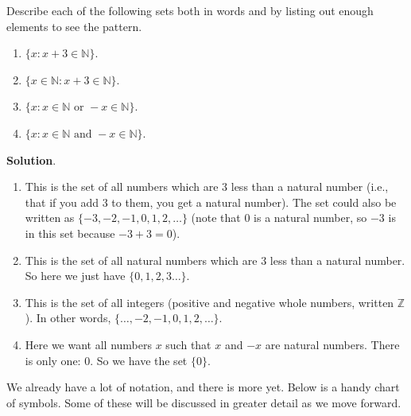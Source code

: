 \documentclass[11pt,]{book}
\theoremstyle{ptxplainnotitle}
\theoremstyle{ptxplaintitle}
\theoremstyle{ptxdefinitionnotitle}
\theoremstyle{ptxdefinitiontitle}
\theoremstyle{ptxdefinitionnotitle}
\theoremstyle{ptxdefinitiontitle}
\theoremstyle{ptxdefinitionnotitle}
\theoremstyle{ptxdefinitiontitle}
\theoremstyle{ptxdefinitiontitlenonumber}
\theoremstyle{ptxdefinitiontitlenonumber}
\numberwithin{equation}{chapter}
\newcommand{\N}{\mathbb N}
\newcommand{\Z}{\mathbb Z}
\newcommand{\st}{:}
\begin{document}
\begin{example}\label{example-28}
\hypertarget{p-717}{}%
Describe each of the following sets both in words and by listing out enough elements to see the pattern.%
\par
\hypertarget{p-718}{}%
\leavevmode%
\begin{enumerate}
\item\hypertarget{li-260}{}\(\{x \st x + 3 \in \N\}\).%
\item\hypertarget{li-261}{}\(\{x \in \N \st x + 3 \in \N\}\).%
\item\hypertarget{li-262}{}\(\{x \st x \in \N \text{ or } -x \in \N\}\).%
\item\hypertarget{li-263}{}\(\{x \st x \in \N \text{ and } -x \in \N\}\).%
\end{enumerate}
%
\par\smallskip%
\noindent\textbf{Solution}.\hypertarget{solution-100}{}\quad%
\hypertarget{p-719}{}%
\leavevmode%
\begin{enumerate}
\item\hypertarget{li-264}{}\hypertarget{p-720}{}%
This is the set of all numbers which are 3 less than a natural number (i.e., that if you add 3 to them, you get a natural number). The set could also be written as \(\{-3, -2, -1, 0, 1, 2, \ldots\}\) (note that 0 is a natural number, so \(-3\) is in this set because \(-3 + 3 = 0\)).%
\item\hypertarget{li-265}{}\hypertarget{p-721}{}%
This is the set of all natural numbers which are 3 less than a natural number. So here we just have \(\{0, 1, 2,3 \ldots\}\).%
\item\hypertarget{li-266}{}\hypertarget{p-722}{}%
This is the set of all integers  (positive and negative whole numbers, written \(\Z\)). In other words, \(\{\ldots, -2, -1, 0, 1, 2, \ldots\}\).%
\item\hypertarget{li-267}{}\hypertarget{p-723}{}%
Here we want all numbers \(x\) such that \(x\) and \(-x\) are natural numbers. There is only one: 0. So we have the set \(\{0\}\).%
\end{enumerate}
%
\end{example}
\hypertarget{p-724}{}%
We already have a lot of notation, and there is more yet. Below is a handy chart of symbols. Some of these will be discussed in greater detail as we move forward.%
\end{document}
